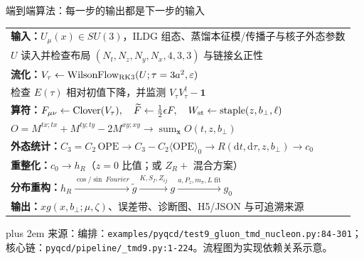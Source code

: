 \documentclass[UTF8,aspectratio=169,11pt]{ctexbeamer}
\newcommand{\source}[1]{%
  \par\vspace{0.02em}\begingroup\fontsize{6}{6.8}\selectfont\raggedright\sloppy
  \setlength{\emergencystretch}{3em}\rightskip=0pt plus 2em
  \color{muted}来源：#1\par\endgroup}
\begin{document}
\begin{frame}[t]{端到端算法：每一步的输出都是下一步的输入}
  \centering
  \small
  \begin{tabular}{@{}l@{}}
    \textbf{输入：}\(U_\mu(x)\in SU(3)\)，ILDG 组态、蒸馏本征模/传播子与核子外态参数\\
    \quad \(U\) 读入并检查布局 \((N_t,N_z,N_y,N_x,4,3,3)\) 与链接幺正性\\
    \textbf{流化：}\(V_\tau\leftarrow\operatorname{WilsonFlow}_{\rm RK3}(U;\tau=3a^2,\varepsilon)\)\\
    \quad 检查 \(E(\tau)\) 相对初值下降，并监测 \(V_\tau V_\tau^\dagger-\mathbf1\)\\
    \textbf{算符：}\(F_{\mu\nu}\leftarrow\operatorname{Clover}(V_\tau),\quad
      \widetilde F\leftarrow\tfrac12\epsilon F,\quad W_{\rm st}\leftarrow\operatorname{staple}(z,b_\perp,\ell)\)\\
    \quad \(O=M^{tx;tx}+M^{ty;ty}-2M^{xy;xy}\to\operatorname{sum}_{\boldsymbol x}O(t,z,b_\perp)\)\\
    \textbf{外态统计：}\(C_3=C_2\,\mathrm{OPE}\to C_3-C_2\langle\mathrm{OPE}\rangle_0
      \to R(\mathrm dt,\mathrm d\tau,z,b_\perp)\to c_0\)\\
    \textbf{重整化：}\(c_0\to h_R\)（\(z=0\) 比值；或 \(Z_R+\) 混合方案）\\
    \textbf{分布重构：}\(h_R\xrightarrow{\cos/\sin\ Fourier}\widetilde g
      \xrightarrow{K,S_I,Z_{ij}}g\xrightarrow{a,P_z,m_\pi,L\;\mathrm{fit}}g_0\)\\
    \textbf{输出：}\(xg(x,b_\perp;\mu,\zeta)\)、误差带、诊断图、H5/JSON 与可追溯来源
  \end{tabular}
  \vfill
  \source{编排：\nolinkurl{examples/pyqcd/test9_gluon_tmd_nucleon.py:84-301}；核心链：\nolinkurl{pyqcd/pipeline/_tmd9.py:1-224}。流程图为实现依赖关系示意。}
\end{frame}
\end{document}
